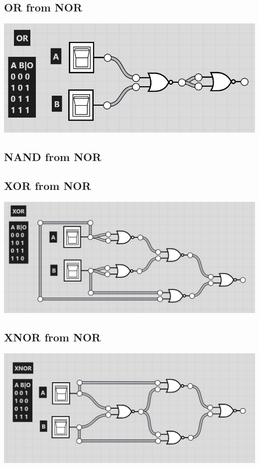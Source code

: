 \documentclass[11pt]{book}
\begin{document}
\subsection{OR from NOR}

\includegraphics[width=\textwidth]{figures/OR.jpg}

\subsection{NAND from NOR}


\subsection{XOR from NOR}

\includegraphics[width=\textwidth]{figures/XOR.jpg}

\subsection{XNOR from NOR}

\includegraphics[width=\textwidth]{figures/XNOR.jpg}
\end{document}
